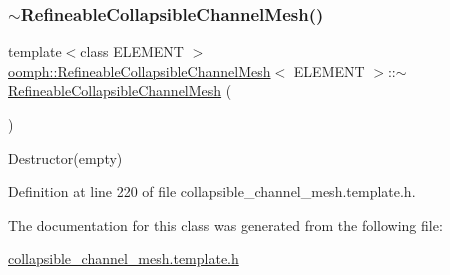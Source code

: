 \subsubsection{\texorpdfstring{$\sim$\+Refineable\+Collapsible\+Channel\+Mesh()}{~RefineableCollapsibleChannelMesh()}}
{\footnotesize\ttfamily template$<$class E\+L\+E\+M\+E\+NT $>$ \\
\hyperlink{classoomph_1_1RefineableCollapsibleChannelMesh}{oomph\+::\+Refineable\+Collapsible\+Channel\+Mesh}$<$ E\+L\+E\+M\+E\+NT $>$\+::$\sim$\hyperlink{classoomph_1_1RefineableCollapsibleChannelMesh}{Refineable\+Collapsible\+Channel\+Mesh} (\begin{DoxyParamCaption}{ }\end{DoxyParamCaption})\hspace{0.3cm}{\ttfamily [inline]}}



Destructor(empty) 



Definition at line 220 of file collapsible\+\_\+channel\+\_\+mesh.\+template.\+h.



The documentation for this class was generated from the following file\+:\begin{DoxyCompactItemize}
\item 
\hyperlink{collapsible__channel__mesh_8template_8h}{collapsible\+\_\+channel\+\_\+mesh.\+template.\+h}\end{DoxyCompactItemize}
